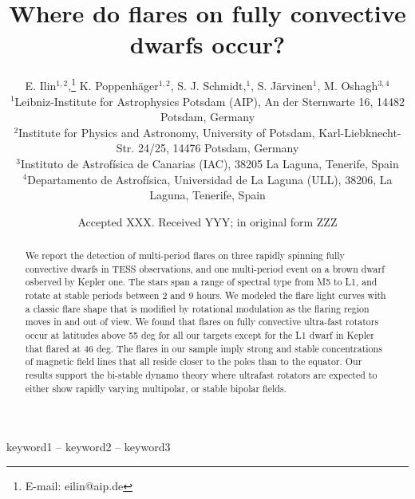 \documentclass[fleqn,usenatbib,letters]{mnras}%
\title[Where do flares on fully convective dwarfs occur?]{Where do flares on fully convective dwarfs occur?}
\author[E. Ilin et al.]{
E. Ilin$^{1,2}$,\thanks{E-mail: eilin@aip.de}
K. Poppenh\"ager$^{1,2}$,
S. J. Schmidt,$^{1}$,
S. J\"arvinen$^{1}$,
M. Oshagh$^{3,4}$
\\
$^{1}$Leibniz-Institute for Astrophysics Potsdam (AIP), An der Sternwarte 16, 14482 Potsdam, Germany\\
$^{2}$Institute for Physics and Astronomy, University of Potsdam, Karl-Liebknecht-Str. 24/25, 14476 Potsdam, Germany\\
$^{3}$Instituto de Astrof\'isica de Canarias (IAC), 38205 La Laguna, Tenerife, Spain\\
$^{4}$Departamento de Astrof\'isica, Universidad de La Laguna (ULL), 38206, La Laguna, Tenerife, Spain
}
\date{Accepted XXX. Received YYY; in original form ZZZ}
\begin{document}
\label{firstpage}
\pagerange{\pageref{firstpage}--\pageref{lastpage}}
\maketitle

\begin{abstract}
We report the detection of multi-period flares on three rapidly spinning fully convective dwarfs in TESS observations, and one multi-period event on a brown dwarf osberved by Kepler one. The stars span a range of spectral type from M5 to L1, and rotate at stable periods between 2 and 9 hours. We modeled the flare light curves with a classic flare shape that is modified by rotational modulation as the flaring region moves in and out of view. We found that flares on fully convective ultra-fast rotators occur at latitudes above 55 deg for all our targets except for the L1 dwarf in Kepler that flared at 46 deg. The flares in our sample imply strong and stable concentrations of magnetic field lines that all reside closer to the poles than to the equator. Our results support the bi-stable dynamo theory where ultrafast rotators are expected to either show rapidly varying multipolar, or stable bipolar fields. 
\end{abstract}

\begin{keywords}
keyword1 -- keyword2 -- keyword3
\end{keywords}




\end{document}
